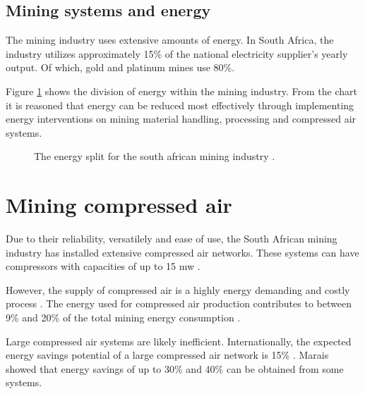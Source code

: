 \subsection{Mining systems and energy}
The mining industry uses extensive amounts of energy. In South Africa, the industry utilizes approximately 15\% of the national electricity supplier's yearly output. Of which, gold and platinum mines use 80\%.\cite{Eskom2010Energy}\par
Figure \ref{fig: Energy Split} shows the division of energy within the mining industry. From the chart it is reasoned that energy can be reduced most effectively through implementing energy interventions on mining material handling, processing and compressed air systems.
\begin{figure}[h]
	\centering
	\caption[The energy split for the south african mining industry.]{The energy split for the south african mining industry \cite{Eskom2010Energy}.}
	\label{fig: Energy Split}
\end{figure}
\par
\section{Mining compressed air}
Due to their reliability, versatilely and ease of use, the South African mining industry has installed extensive compressed air networks. These systems can have compressors with capacities of up to 15 \gls{mw} \cite{Marais2012PhD}.\par
However, the supply of compressed air is a highly energy demanding and costly process \cite{padachi2009energy}.  The energy used for compressed air production contributes to between 9\% and 20\% of the total mining energy consumption \cite{Eskom2010Energy,du2011development}. \par
Large compressed air systems are likely inefficient. Internationally, the expected energy savings potential of a large compressed air network is 15\% \cite{neale2009compressed}. Marais \cite{marais2013simplification} showed that energy savings of up to 30\% and 40\% can be obtained from some systems. 
